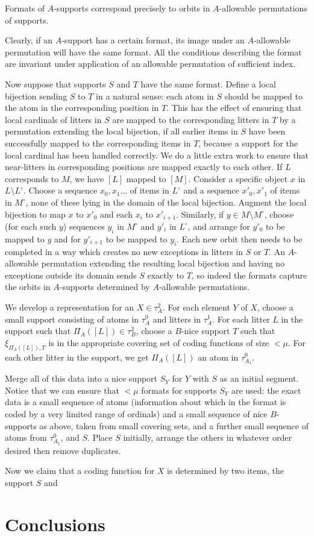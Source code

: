 \documentclass[12pt]{article}
\begin{document}
Formats of $A$-supports correspond precisely to orbits in $A$-allowable permutations of supports.

Clearly, if an $A$-support has a certain format, its image under an $A$-allowable permutation will have the same format.  All the conditions describing the format
are invariant under application of an allowable permutation of sufficient index.

Now suppose that supports $S$ and $T$ have the same format.  Define a local bijection sending $S$ to $T$ in a natural sense:  each atom in $S$ should be mapped to the atom in the corresponding position in $T$.  This has the effect of ensuring that local cardinals of litters in $S$ are mapped to the corresponding litters in $T$ by a permutation extending the local bijection, if all earlier items in $S$ have been successfully mapped to the corresponding items in $T$, because a support for the local cardinal has been handled correctly.  We do a little extra work to ensure that near-litters in corresponding positions are mapped exactly to each other.   If $L$ corresponds to $M$, we have $[L]$ mapped to $[M]$.  Consider a specific object $x$ in
$L \setminus L^\circ$.  Choose a sequence $x_0, x_1\ldots$ of items in $L^\circ$ and a sequence $x'_0,x'_1$ of items in $M^\circ$, none of these lying in the domain of the local bijection.
Augment the local bijection to map $x$ to $x'_0$ and each $x_i$ to $x'_{i+1}$.   Similarly, if $y \in M\setminus M^\circ$, choose (for each such $y$) sequences $y_i$ in $M^\circ$ and
$y'_i$ in $L^\circ$, and arrange for $y'_0$ to be mapped to $y$ and for $y'_{i+1}$ to be mapped to $y_i$.  Each new orbit then needs to be completed in a way which creates no new exceptions in litters in $S$ or $T$.  An $A$-allowable permutation extending the resulting local bijection and having no exceptions outside its domain sends $S$ exactly to $T$, so indeed the formats capture the
orbits in $A$-supports determined by $A$-allowable permutations.

We develop a representation for an $X \in \tau^2_A$.  For each element $Y$ of $X$, choose a small support consisting of atoms in $\tau^0_A$ and litters in $\tau^1_A$.
For each litter $L$ in the support such that $\Pi_A([L]) \in \tau^2_B$, choose a $B$-nice support $T$ such that $\xi_{\Pi_A([L]),T}$ is in the appropriate covering set of coding functions
of size $<\mu$.  For each other litter in the support, we get $\Pi_A([L])$ an atom in $\tau^0_{A_1}$.

Merge all of this data into a nice support $S_Y$ for $Y$ with $S$ as an initial segment.  Notice that we can ensure that $<\mu$ formats for supports $S_Y$ are used:
the exact data is a small sequence of atoms (information about which in the format is coded by a very limited range of ordinals) and a small sequence of nice $B$-supports as above, taken from small covering sets, and a further small sequence of atoms from $\tau^0_{A_1}$, and $S$.  Place $S$ initially, arrange the others in whatever order desired then remove duplicates.

Now we claim that a coding function for $X$ is determined by two items, the support $S$ and 

\newpage

\section{Conclusions}
\end{document}
